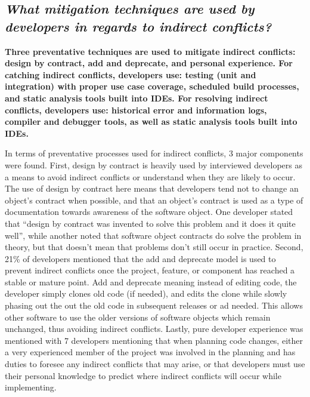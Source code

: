 \documentclass[conference]{IEEEtran}
\begin{document}
{}
\subsection*{ \it{What mitigation techniques are used by developers in regards to indirect conflicts?}}

\bf{Three preventative techniques are used to mitigate indirect conflicts: design by contract, add and deprecate, and personal
experience. For catching indirect conflicts, developers use: testing (unit and integration) with proper use case coverage,
scheduled build processes, and static analysis tools built into IDEs. For resolving indirect conflicts, developers use: historical
error and information logs, compiler and debugger tools, as well as static analysis tools built into IDEs.}

\normalfont{}

In terms of preventative processes used for indirect conflicts, 3 major components were found.
First, design by contract is heavily used by interviewed developers as a means to avoid indirect conflicts or understand
when they are likely to occur. The use of design by contract here means that developers tend not to change an object's
contract when possible, and that an object's contract is used as a type of documentation towards awareness of the
software object. One developer stated that ``design by contract was invented to solve this problem and it does it
quite well'', while another noted that software object contracts do solve the problem in theory, but that doesn't
mean that problems don't still occur in practice.
Second, 21\% of developers mentioned that the add and deprecate
model is used to prevent indirect conflicts once
the project, feature, or component has reached a stable or mature point.
Add and deprecate meaning instead of editing code, the developer simply clones old code (if needed), and edits the clone
while slowly phasing out the out the old code in subsequent releases or ad needed. This allows other software to
use the older versions of software objects which remain unchanged, thus avoiding indirect conflicts.
Lastly, pure developer experience was mentioned with 7 developers mentioning that when planning code changes,
either a very experienced member of the project was involved in the planning and has duties to foresee any
indirect conflicts that may arise, or that developers must use their personal knowledge to predict where indirect
conflicts will occur while implementing.
\end{document}
